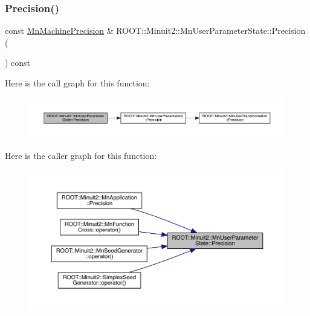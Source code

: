 \subsubsection{\texorpdfstring{Precision()}{Precision()}\hspace{0.1cm}{\footnotesize\ttfamily [2/3]}}
{\footnotesize\ttfamily const \mbox{\hyperlink{classROOT_1_1Minuit2_1_1MnMachinePrecision}{Mn\+Machine\+Precision}} \& R\+O\+O\+T\+::\+Minuit2\+::\+Mn\+User\+Parameter\+State\+::\+Precision (\begin{DoxyParamCaption}{ }\end{DoxyParamCaption}) const}

Here is the call graph for this function\+:
\nopagebreak
\begin{figure}[H]
\begin{center}
\leavevmode
\includegraphics[width=350pt]{d3/de0/classROOT_1_1Minuit2_1_1MnUserParameterState_a03f90db04e5573afaef3865d0d87b85b_cgraph}
\end{center}
\end{figure}
Here is the caller graph for this function\+:
\nopagebreak
\begin{figure}[H]
\begin{center}
\leavevmode
\includegraphics[width=350pt]{d3/de0/classROOT_1_1Minuit2_1_1MnUserParameterState_a03f90db04e5573afaef3865d0d87b85b_icgraph}
\end{center}
\end{figure}
\mbox{\label{classROOT_1_1Minuit2_1_1MnUserParameterState_aff32da1a78b79f578541e42e91e37563}} 
